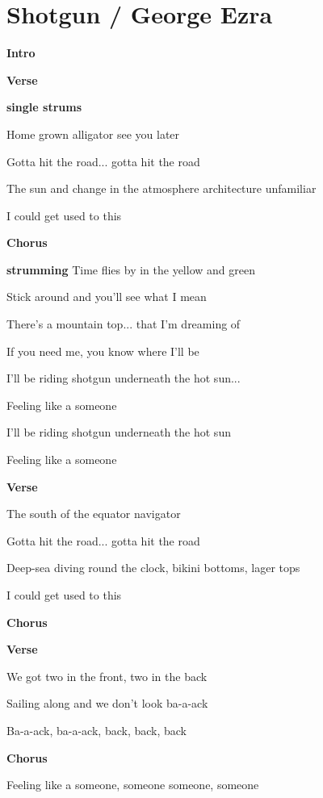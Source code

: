 \section{Shotgun / George Ezra}\label{sec:shotgun}

\Fmajor
\BflatMajor
\Dminor
\Cmajor

\textbf{Intro}

   

\textbf{Verse}

\textbf{single strums}

Home grown alligator see you later

Gotta hit the road... gotta hit the road

The sun and change in the atmosphere architecture unfamiliar

 I could get used to this 

\textbf{Chorus}

\textbf{strumming} Time flies by in the yellow and green

Stick around and you’ll see what I mean

There’s a mountain top... that I’m dreaming of

If you need me, you know where I’ll be

I’ll be riding shotgun underneath the hot sun...

Feeling like a someone 

I’ll be riding shotgun underneath the hot sun

Feeling like a someone 

\textbf{Verse}

The south of the equator navigator

Gotta hit the road... gotta hit the road

Deep-sea diving round the clock, bikini bottoms, lager tops

 I could get used to this 

\textbf{Chorus}

\textbf{Verse}

We got two in the front, two in the back

Sailing along and we don’t look ba-a-ack

Ba-a-ack, ba-a-ack, back, back, back

 

\textbf{Chorus}

Feeling like a someone, someone someone, someone

    


